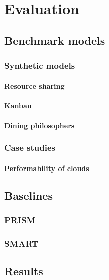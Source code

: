 \chapter{Evaluation}
\label{chap:evaluation}

\section{Benchmark models}

\subsection{Synthetic models}

\subsubsection{Resource sharing}

\subsubsection{Kanban}

\subsubsection{Dining philosophers}

\subsection{Case studies}

\subsubsection{Performability of clouds}

\section{Baselines}

\subsection{PRISM}

\subsection{SMART}

\section{Results}
